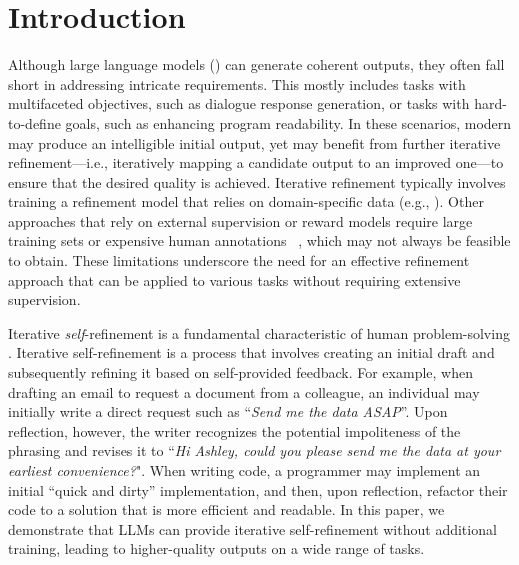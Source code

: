 

\section{Introduction}





Although large language models (\llms) can generate coherent outputs, they often fall short in addressing intricate requirements. This mostly includes tasks
with multifaceted objectives, 
such as dialogue response generation, or tasks with hard-to-define goals, such as enhancing program readability. 
In these scenarios, modern \llms may produce an intelligible initial output, yet may benefit from further iterative refinement---i.e., iteratively mapping a candidate output to an improved one---to ensure that 
the desired quality is achieved. 
Iterative refinement typically involves training a refinement model that relies on domain-specific data (e.g., \citet{reid2022learning,timoschick2022PEER,Welleck2022SelfCorrect}).
Other approaches that rely on external supervision or reward models require large training sets or expensive human annotations ~\citep{madaan2021graphcorr, Ouyang2022TrainingLM}, which may not always be feasible to obtain. %
These limitations underscore the need for an effective refinement approach
that can be applied to various tasks without requiring extensive supervision.








Iterative \emph{self}-refinement is a fundamental characteristic of human problem-solving \citep{simon1966complexity,flower1981cognitive,amabile_theoretical_1983}. Iterative self-refinement is a process that involves creating an initial draft and subsequently refining it based on self-provided feedback.
For example, when drafting an email to request a document from a colleague, an individual may initially write a direct request such as ``\textit{Send me the data ASAP}''.
Upon reflection, however, the writer recognizes the potential impoliteness of the phrasing and revises it to ``\textit{Hi Ashley, could you please send me the data at your earliest convenience?}". 
When writing code, a programmer may implement an initial ``quick and dirty'' implementation, and then, upon reflection, refactor their code to a solution that is more efficient and readable.
In this paper, we demonstrate that LLMs can provide 
iterative self-refinement without additional training, leading to higher-quality outputs on a wide range of tasks.

